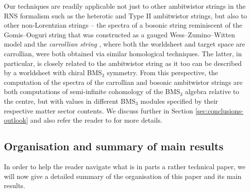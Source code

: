 \documentclass[11pt,reqno,a4paper,final]{amsart}
\theoremstyle{plain}
\theoremstyle{definition}
\newcommand{\1}{\mathbb{1}}
\numberwithin{equation}{section}
\begin{document}
Our techniques are readily applicable not just to other ambitwistor
strings in the RNS formalism such as the heterotic
\cite{Adamo:2018hzd} and Type II ambitwistor \cite{Adamo:2014wea}
strings, but also to other non-Lorentzian strings -- the spectra of a
bosonic string reminiscent of the Gomis--Ooguri string that was
constructed as a gauged Wess--Zumino--Witten model
\cite{Figueroa-OFarrill:2025nmo} and the \emph{carrollian string}
\cite{Gomis:2023eav, Blair:2023noj, Chen:2025gaz,
  Figueroa-OFarrill:2025njv}, where both the worldsheet and target
space are carrollian, were both obtained via similar homological
techniques. The latter, in particular, is closely related to the
ambitwistor string as it too can be described by a worldsheet with
chiral BMS$_3$ symmetry. From this perspective, the computation of the
spectra of the carrollian and bosonic ambitwistor strings are both
computations of semi-infinite cohomology of the BMS$_3$ algebra
relative to the centre, but with values in different BMS$_3$ modules
specified by their respective matter sector contents. We discuss
further in Section \ref{sec:conclusions-outlook} and also refer the
reader to \cite{Figueroa-OFarrill:2025njv} for more details.

\subsection{Organisation and summary of main results}
\label{sec:organ-summ-main}

In order to help the reader navigate what is in parts a rather
technical paper, we will now give a detailed summary of the
organisation of this paper and its main results.
\end{document}
